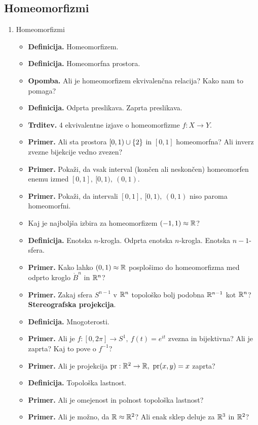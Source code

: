 \subsection{Homeomorfizmi}
\begin{enumerate}
    \item Homeomorfizmi
    \begin{itemize}
        \item \textbf{Definicija.} Homeomorfizem.
        \item \textbf{Definicija.} Homeomorfna prostora.
        \item \textbf{Opomba.} Ali je homeomorfizem ekvivalenčna relacija? Kako nam to pomaga?
        \item \textbf{Definicija.} Odprta preslikava. Zaprta preslikava.
        \item \textbf{Trditev.} 4 ekvivalentne izjave o homeomorfizme $f: X \to Y$.
        \item \textbf{Primer.} Ali sta prostora $[0, 1) \cup \{2\}$ in $[0,1]$ homeomorfna? Ali inverz zvezne bijekcije vedno zvezen?
        \item \textbf{Primer.} Pokaži, da vsak interval (končen ali neskončen) homeomorfen enemu izmed $[0,1], \ [0, 1), \ (0,1)$.
        \item \textbf{Primer.} Pokaži, da intervali $[0,1], \ [0, 1), \ (0,1)$ niso paroma homeomorfni.
        \item Kaj je najboljša izbira za homeomorfizem $(-1, 1) \approx \mathbb{R}$?
        \item \textbf{Definicija.} Enotska $n$-krogla. Odprta enotska $n$-krogla. Enotska $n-1$-sfera.
        \item \textbf{Primer.} Kako lahko $(0, 1) \approx \mathbb{R}$ posplošimo do homeomorfizma med odprto kroglo $\mathring{B}^n$ in $\mathbb{R}^n$?
        \item \textbf{Primer.} Zakaj sfera $S^{n-1}$ v $\mathbb{R}^n$ topološko bolj podobna $\mathbb{R}^{n-1}$ kot $\mathbb{R}^n$? \textbf{Stereografska projekcija}.
        \item \textbf{Definicija.} Mnogoterosti.
        \item \textbf{Primer.}  Ali je $f: [0, 2 \pi] \to S^1, \ f(t) = e^{it}$ zvezna in bijektivna? Ali je zaprta? Kaj to pove o $f^{-1}$?
        \item \textbf{Primer.} Ali je projekcija $\operatorname{pr}: \mathbb{R}^2 \to \mathbb{R}, \ \operatorname{pr}(x,y) = x$ zaprta?
        \item \textbf{Definicija.} Topološka lastnost.
        \item \textbf{Primer.} Ali je omejenost in polnost topološka lastnost?
        \item \textbf{Primer.} Ali je možno, da $\mathbb{R} \approx \mathbb{R}^2$? Ali enak sklep deluje za $\mathbb{R}^3$ in $\mathbb{R}^2$?
    \end{itemize}
\end{enumerate}

